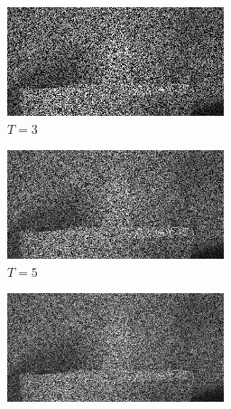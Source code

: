 \documentclass[a4paper, landscape]{article}
\begin{document}
\begin{figure}[H]
	\centering
	\begin{subfigure}{0.2\linewidth}
		\centering
		\includegraphics[width=\linewidth]{flame/coded snapshot, T = 3.png}
		\caption{$T=3$}
	\end{subfigure}
	\begin{subfigure}{0.2\linewidth}
		\centering
		\includegraphics[width=\linewidth]{flame/coded snapshot, T = 5.png}
		\caption{$T=5$}
	\end{subfigure}
	\begin{subfigure}{0.2\linewidth}
		\centering
		\includegraphics[width=\linewidth]{flame/coded snapshot, T = 7.png}

\end{subfigure}
\end{figure}
\end{document}
